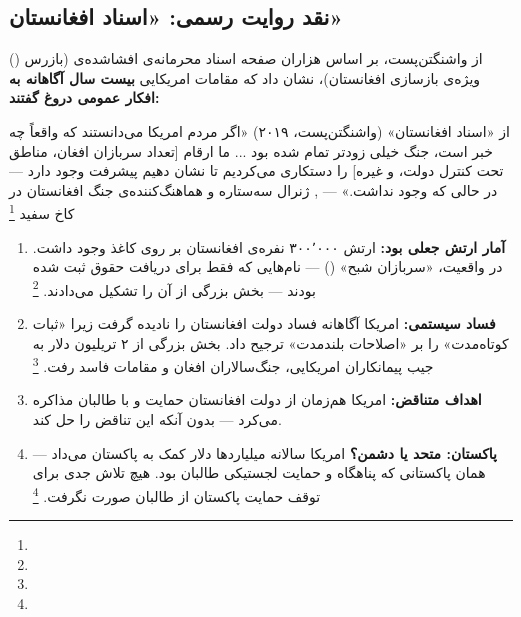 \subsection{نقد روایت رسمی: «اسناد افغانستان»}
\label{subsec:app-afg-papers}

 () از واشنگتن‌پست، بر اساس هزاران صفحه اسناد محرمانه‌ی افشاشده‌ی  (بازرس ویژه‌ی بازسازی افغانستان)، نشان داد که مقامات امریکایی \textbf{بیست سال آگاهانه به افکار عمومی دروغ گفتند:}

\begin{histQuote}{از «اسناد افغانستان» (واشنگتن‌پست، ۲۰۱۹)}
«اگر مردم امریکا می‌دانستند که واقعاً چه خبر است، جنگ خیلی زودتر تمام شده بود ... ما ارقام [تعداد سربازان افغان، مناطق تحت کنترل دولت، و غیره] را دستکاری می‌کردیم تا نشان دهیم پیشرفت وجود دارد — در حالی که وجود نداشت.»
— , ژنرال سه‌ستاره و هماهنگ‌کننده‌ی جنگ افغانستان در کاخ سفید%
\footnote{}
\end{histQuote}

\begin{tcolorbox}[enemybox, title={یافته‌های کلیدی «اسناد افغانستان»}]
\begin{enumerate}[nosep, label=\textbf{\arabic*.}]
  \item \textbf{آمار ارتش جعلی بود:} ارتش ۳۰۰٬۰۰۰ نفره‌ی افغانستان بر روی کاغذ وجود داشت. در واقعیت، «سربازان شبح» () — نام‌هایی که فقط برای دریافت حقوق ثبت شده بودند — بخش بزرگی از آن را تشکیل می‌دادند.%
  \footnote{}

  \item \textbf{فساد سیستمی:} امریکا آگاهانه فساد دولت افغانستان را نادیده گرفت زیرا «ثبات کوتاه‌مدت» را بر «اصلاحات بلندمدت» ترجیح داد. بخش بزرگی از ۲ تریلیون دلار به جیب پیمانکاران امریکایی، جنگ‌سالاران افغان و مقامات فاسد رفت.%
  \footnote{}

  \item \textbf{اهداف متناقض:} امریکا هم‌زمان از دولت افغانستان حمایت و با طالبان مذاکره می‌کرد — بدون آنکه این تناقض را حل کند.

  \item \textbf{پاکستان: متحد یا دشمن؟} امریکا سالانه میلیاردها دلار کمک به پاکستان می‌داد — همان پاکستانی که پناهگاه و حمایت لجستیکی طالبان بود. هیچ تلاش جدی برای توقف حمایت پاکستان از طالبان صورت نگرفت.%
  \footnote{}
\end{enumerate}
\end{tcolorbox}

